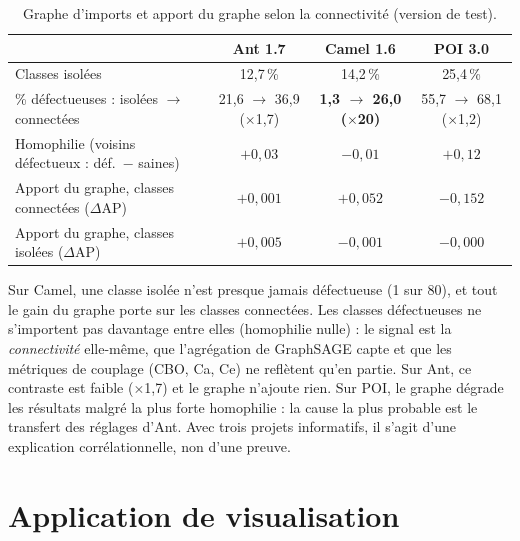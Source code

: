 \documentclass[11pt,a4paper,openany]{report}
\newcommand{\best}[1]{\textbf{\color{primary}#1}}
\begin{document}
\begin{table}[H]
\centering\small
\caption{Graphe d'imports et apport du graphe selon la connectivité (version de test).}
\label{tab:graph}
\begin{tabularx}{\linewidth}{>{\raggedright\arraybackslash}Xccc}
\toprule
 & \textbf{Ant 1.7} & \textbf{Camel 1.6} & \textbf{POI 3.0} \\
\midrule
Classes isolées                                   & 12,7\,\% & 14,2\,\% & 25,4\,\% \\
\% défectueuses : isolées $\to$ connectées & 21,6 $\to$ 36,9 ($\times$1,7) & \best{1,3 $\to$ 26,0 ($\times$20)} & 55,7 $\to$ 68,1 ($\times$1,2) \\
Homophilie (voisins défectueux : déf.\ $-$ saines) & $+0{,}03$ & $-0{,}01$ & $+0{,}12$ \\
Apport du graphe, classes connectées ($\Delta$AP) & $+0{,}001$ & \best{$+0{,}052$} & $-0{,}152$ \\
Apport du graphe, classes isolées ($\Delta$AP)    & $+0{,}005$ & $-0{,}001$ & $-0{,}000$ \\
\bottomrule
\end{tabularx}
\end{table}

Sur Camel, une classe isolée n'est presque jamais défectueuse (1 sur 80), et tout le gain du graphe porte sur les
classes connectées. Les classes défectueuses ne s'importent pas davantage entre elles (homophilie nulle) : le signal est
la \emph{connectivité} elle-même, que l'agrégation de GraphSAGE capte et que les métriques de couplage (CBO, Ca, Ce) ne
reflètent qu'en partie. Sur Ant, ce contraste est faible ($\times$1,7) et le graphe n'ajoute rien. Sur POI, le graphe
dégrade les résultats malgré la plus forte homophilie : la cause la plus probable est le transfert des réglages d'Ant.
Avec trois projets informatifs, il s'agit d'une explication corrélationnelle, non d'une preuve.

\chapter{Application de visualisation}
\end{document}
